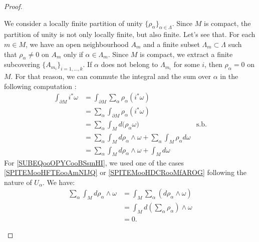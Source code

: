 \begin{proof}
\begin{subproof}
\begin{subproof}
		\end{subproof}
		We consider a locally finite partition of unity \( \{ \rho_{\alpha} \}_{\alpha\in \Lambda}\). Since \( M\) is compact, the partition of unity is not only locally finite, but also finite. Let's see that. For each \( m\in M\), we have an open neighbourhood \( A_{m}\) and a finite subset \( \Lambda_m\subset \Lambda\) such that \( \rho_{\alpha}\neq 0\)  on \( A_{m}\) only if \( \alpha\in \Lambda_m\). Since \( M\) is compact, we extract a finite subcovering \( \{ A_{m_i} \}_{i=1,\ldots,k}\). If \( \alpha\) does not belong to \( \Lambda_{m_i}\) for some \( i\), then \( \rho_{\alpha}=0\) on \( M\). For that reason, we can commute the integral and the sum over \( \alpha\) in the following computation :
		\begin{subequations}
			\begin{align}
				\int_{\partial M}i^*\omega & =\int_{\partial M}\sum_{\alpha}\rho_{\alpha}(i^*\omega)                                                                             \\
				                           & =\sum_{\alpha}\int_{\partial M}\rho_{\alpha}(i^*\omega)                                                                             \\
				                           & =\sum_{\alpha}\int_Md\big( \rho_{\alpha}\omega \big)                                      & \text{s.b.} \label{SUBEQooOPYCooBSsmHI} \\
				                           & = \sum_{\alpha} \int_Md\rho_{\alpha}\wedge \omega+\sum_{\alpha}\int_M\rho_{\alpha}d\omega                                           \\
				                           & = \sum_{\alpha} \int_Md\rho_{\alpha}\wedge \omega+\int_Md\omega
			\end{align}
		\end{subequations}
		For \eqref{SUBEQooOPYCooBSsmHI}, we used one of the cases \ref{SPITEMooHFTEooAmNIJQ} or \ref{SPITEMooHDCRooMfAROG} following the nature of \( U_{\alpha}\). We have:
		\begin{subequations}
			\begin{align}
				\sum_{\alpha}\int_Md\rho_{\alpha}\wedge \omega & =\int_M\sum_{\alpha}(d\rho_{\alpha}\wedge\omega)  \\
				                                               & =\int_Md(\sum_{\alpha}\rho_{\alpha})\wedge \omega \\
				                                               & =0.
			\end{align}
		\end{subequations}
	\end{subproof}
\end{proof}

